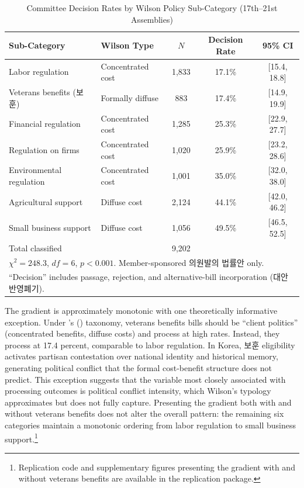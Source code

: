 \documentclass[11pt]{article}
\begin{document}
\begin{table}[htbp]
\centering
\caption{Committee Decision Rates by Wilson Policy Sub-Category (17th--21st Assemblies)}
\label{tab:gradient}
\begin{tabular}{llccc}
\toprule
Sub-Category & Wilson Type & $N$ & Decision Rate & 95\% CI \\
\midrule
Labor regulation & Concentrated cost & 1,833 & 17.1\% & [15.4, 18.8] \\
Veterans benefits (보훈) & Formally diffuse & 883 & 17.4\% & [14.9, 19.9] \\
Financial regulation & Concentrated cost & 1,285 & 25.3\% & [22.9, 27.7] \\
Regulation on firms & Concentrated cost & 1,020 & 25.9\% & [23.2, 28.6] \\
Environmental regulation & Concentrated cost & 1,001 & 35.0\% & [32.0, 38.0] \\
Agricultural support & Diffuse cost & 2,124 & 44.1\% & [42.0, 46.2] \\
Small business support & Diffuse cost & 1,056 & 49.5\% & [46.5, 52.5] \\
\midrule
Total classified & & 9,202 & & \\
\bottomrule
\multicolumn{5}{l}{\footnotesize $\chi^2 = 248.3$, $df = 6$, $p < 0.001$. Member-sponsored 의원발의 법률안 only.} \\
\multicolumn{5}{l}{\footnotesize ``Decision'' includes passage, rejection, and alternative-bill incorporation (대안반영폐기).} \\
\end{tabular}
\end{table}

The gradient is approximately monotonic with one theoretically informative exception. Under \citeauthor{wilson1980}'s (\citeyear{wilson1980}) taxonomy, veterans benefits bills should be ``client politics'' (concentrated benefits, diffuse costs) and process at high rates. Instead, they process at 17.4 percent, comparable to labor regulation. In Korea, 보훈 eligibility activates partisan contestation over national identity and historical memory, generating political conflict that the formal cost-benefit structure does not predict. This exception suggests that the variable most closely associated with processing outcomes is political conflict intensity, which Wilson's typology approximates but does not fully capture. Presenting the gradient both with and without veterans benefits does not alter the overall pattern: the remaining six categories maintain a monotonic ordering from labor regulation to small business support.\footnote{Replication code and supplementary figures presenting the gradient with and without veterans benefits are available in the replication package.}
\end{document}
